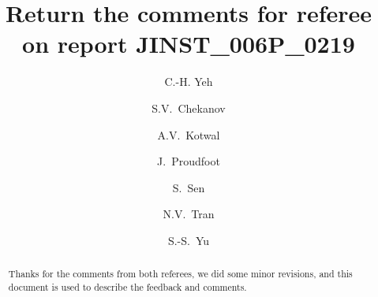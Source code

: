 \documentclass[final,1p,11pt]{elsarticle}
\begin{document}
\begin{frontmatter}

\title{
Return the comments for referee on report JINST\_006P\_0219
}

\author[add3]{C.-H. Yeh}

\author[add1]{S.V.~Chekanov}

\author[addDuke]{A.V.~Kotwal}

\author[add1]{J.~Proudfoot}

\author[addDuke]{S.~Sen}

\author[add2]{N.V.~Tran}

\author[add3]{S.-S.~Yu}

\address[add3]{
Department of Physics and Center for High Energy and High Field Physics, 
National Central University, Chung-Li, Taoyuan City 32001, Taiwan
}

\address[add1]{
HEP Division, Argonne National Laboratory,
9700 S.~Cass Avenue,
Argonne, IL 60439, USA. 
}

\address[addDuke]{
Department of Physics, Duke University, USA
}

\address[add2]{
Fermi National Accelerator Laboratory
}




\begin{abstract}
Thanks for the comments from both referees, we did some minor revisions, and this document is used to describe the feedback and comments. 
\end{abstract}

\begin{keyword}
\end{keyword}

\end{frontmatter}
\end{document}
